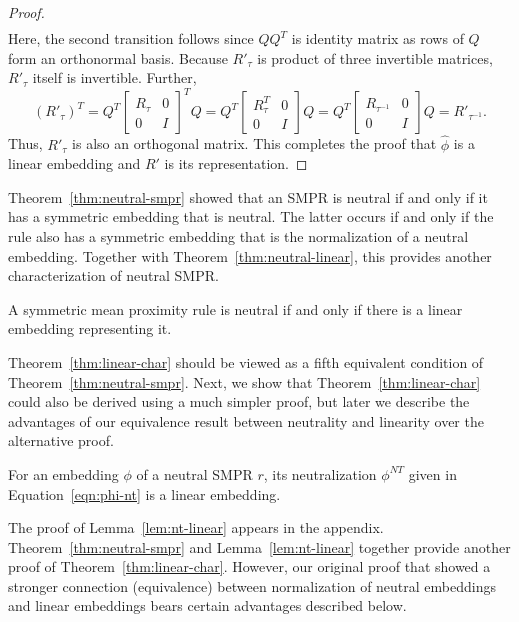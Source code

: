 \documentclass[prodmode,acmec]{ec-acmsmall}
\newcommand{\nt}{NT}
\begin{document}
\begin{proof}
\begin{align*}
\end{align*}
Here, the second transition follows since $Q Q^T$ is identity matrix as rows of $Q$ form an orthonormal basis. Because $R'_{\tau}$ is product of three invertible matrices, $R'_{\tau}$ itself is invertible. Further, 
$$
(R'_{\tau})^T = Q^T \left[ \begin{smallmatrix} R_{\tau} & 0 \\ 0 & I \end{smallmatrix} \right]^T Q = Q^T \left[ \begin{smallmatrix} R_{\tau}^T & 0 \\ 0 & I \end{smallmatrix} \right] Q = Q^T \left[ \begin{smallmatrix} R_{\tau^{-1}} & 0 \\ 0 & I \end{smallmatrix} \right] Q
 = R'_{\tau^{-1}}.
 $$
Thus, $R'_{\tau}$ is also an orthogonal matrix. This completes the proof that $\hat{\phi}$ is a linear embedding and $R'$ is its representation.
\end{proof}

Theorem~\ref{thm:neutral-smpr} showed that an SMPR is neutral if and only if it has a symmetric embedding that is neutral. The latter occurs if and only if the rule also has a symmetric embedding that is the normalization of a neutral embedding. Together with Theorem~\ref{thm:neutral-linear}, this provides another characterization of neutral SMPR. 

\begin{theorem}
A symmetric mean proximity rule is neutral if and only if there is a linear embedding representing it.
\label{thm:linear-char}
\end{theorem}

Theorem~\ref{thm:linear-char} should be viewed as a fifth equivalent condition of Theorem~\ref{thm:neutral-smpr}. Next, we show that Theorem~\ref{thm:linear-char} could also be derived using a much simpler proof, but later we describe the advantages of our equivalence result between neutrality and linearity over the alternative proof. 

\begin{lemma}
For an embedding $\phi$ of a neutral SMPR $r$, its neutralization $\phi^{\nt}$ given in Equation~\eqref{eqn:phi-nt} is a linear embedding.
\label{lem:nt-linear}
\end{lemma}

The proof of Lemma~\ref{lem:nt-linear} appears in the appendix. Theorem~\ref{thm:neutral-smpr} and Lemma~\ref{lem:nt-linear} together provide another proof of Theorem~\ref{thm:linear-char}. However, our original proof that showed a stronger connection (equivalence) between normalization of neutral embeddings and linear embeddings bears certain advantages described below.
\end{document}
